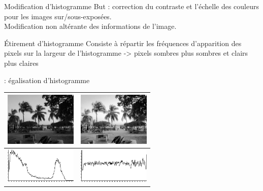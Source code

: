 \documentclass[14pt]{beamer}
\begin{document}
\begin{frame}{\subsecname}
\begin{block}{Modification d'histogramme}
But : correction du contraste et l'échelle des couleurs pour les images sur/sous-exposées.\\
Modification non altérante des informations de l'image.
\end{block}

\begin{block}{Étirement d'histogramme}
Consiste à répartir les fréquences d'apparition des pixels sur la largeur de l'histogramme -> pixels sombres plus sombres et clairs plus claires
\end{block}
\end{frame}


\begin{frame}{\subsecname : égalisation d'histogramme}
\begin{table}[h]
\centering
\begin{tabular}{|c|c|}
\hline
\includegraphics[width=130px]{image_exemple_plage}
&  
\includegraphics[width=130px]{image_exemple_plage_eq}
 \\
 \hline
\includegraphics[width=130px]{image_exemple_plage_hist}
& 
\includegraphics[width=130px]{image_exemple_plage_eq_hist}
 \\
 \hline
\end{tabular}
\end{table}
\end{frame}
\end{document}
